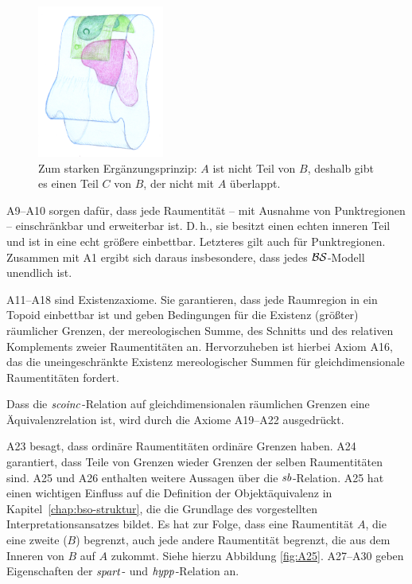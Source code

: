 \begin{figure}[ht]
    \centering
    \includegraphics[height=5cm]{abb/supplementation.png}
    \caption[Zum starken Ergänzungsprinzip]{Zum starken Ergänzungsprinzip: $A$ ist nicht Teil von $B$, deshalb gibt es einen Teil $C$ von $B$, der nicht mit $A$ überlappt.}
    \label{fig:supplementation}
\end{figure}


A9--A10
sorgen dafür, dass jede Raumentität -- mit Ausnahme von Punktregionen -- einschränkbar und erweiterbar ist. D.\,h., sie besitzt einen echten inneren Teil und ist in eine echt größere einbettbar. Letzteres gilt auch für Punktregionen.
Zusammen mit A1 ergibt sich daraus insbesondere, dass jedes $\mathcal{BS}$-Modell unendlich ist.

A11--A18
sind Existenzaxiome. 
Sie garantieren, dass jede Raumregion in ein Topoid einbettbar ist und geben Bedingungen für die Existenz (größter) räumlicher Grenzen, der mereologischen Summe, des Schnitts und des relativen Komplements zweier Raumentitäten an.
Hervorzuheben ist hierbei Axiom A16, das die uneingeschränkte Existenz mereologischer Summen für gleichdimensionale Raumentitäten fordert.

Dass
die $\mathit{scoinc}$-Relation auf gleichdimensionalen räumlichen Grenzen eine Äquivalenzrelation ist, wird durch die Axiome A19--A22 ausgedrückt.

A23
besagt, dass ordinäre Raumentitäten ordinäre Grenzen haben.
A24 garantiert, dass Teile von Grenzen wieder Grenzen der selben Raumentitäten sind.
A25 und A26 enthalten weitere Aussagen über die $\mathit{sb}$-Relation.
A25 hat einen wichtigen Einfluss auf die Definition der Objektäquivalenz in Kapitel~\ref{chap:bso-struktur}, die die Grundlage des vorgestellten Interpretationsansatzes bildet.
Es hat zur Folge, dass eine Raumentität $A$, die eine zweite ($B$) begrenzt, auch jede andere Raumentität begrenzt, die \glqq aus dem Inneren von $B$ auf $A$ zukommt\grqq .
Siehe hierzu Abbildung \ref{fig:A25}.
A27--A30
geben Eigenschaften der $\mathit{spart}$- und $\mathit{hypp}$-Relation an.


